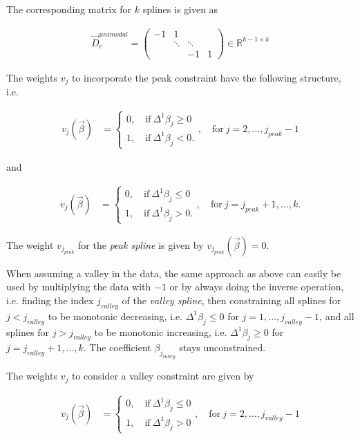 \documentclass[10pt,a4paper]{report}
\begin{document}
The corresponding matrix for $k$ splines is given as 

\begin{align}\label{eq:D_c_unimodal}
	\vec{D}_c^{unimodal} = \begin{pmatrix} -1 & 1 \\ 
		& \ddots & \ddots  \\
		& & -1 & 1
	\end{pmatrix} \in \mathbb{R}^{k-1 \times k}
\end{align}

The weights $v_j$ to incorporate the peak constraint have the following structure, i.e.

\begin{align}\label{eq:v_peak_1}
	v_j(\vec{\beta}) &= \begin{cases} 
		0, \quad \text{if} \ \Delta^1\beta_j \ge 0 \\ 
		1, \quad \text{if} \ \Delta^1\beta_j  < 0.
	\end{cases}, \quad \text{for} \ j=2, \dots, j_{peak}-1
\end{align}

and

\begin{align}\label{eq:v_peak_2}
	v_j(\vec{\beta}) &= \begin{cases} 
		0, \quad \text{if} \ \Delta^1\beta_j \le 0 \\ 
		1, \quad \text{if} \ \Delta^1\beta_j > 0.
	\end{cases}, \quad \text{for} \ j=j_{peak}+1, \dots, k.
\end{align}

The weight $v_{j_{peak}}$ for the \emph{peak spline} is given by $v_{j_{peak}}(\vec{\beta}) = 0$. 

When assuming a valley in the data, the same approach as above can easily be used by multiplying the data with $-1$ or by always doing the inverse operation, i.e. finding the index $j_{valley}$ of the \emph{valley spline}, then constraining all splines for $j < j_{valley}$ to be monotonic decreasing, i.e. $\Delta^1 \beta_j \le 0$ for $j = 1, \dots, j_{valley}-1$, and all splines for $j > j_{valley}$ to be monotonic increasing, i.e. $\Delta^1 \beta_j \ge 0$ for $j = j_{valley}+1, \dots, k$. The coefficient $\beta_{j_{valley}}$ stays unconstrained. 

The weights $v_j$ to consider a valley constraint are given by

\begin{align}\label{eq:v_valley_1}
	v_j(\vec{\beta}) &= \begin{cases} 
		0, \quad \text{if} \ \Delta^1\beta_j \le 0 \\ 
		1, \quad \text{if} \ \Delta^1\beta_j > 0
	\end{cases}, \quad \text{for} \ j=2, \dots, j_{valley}-1
\end{align}
\end{document}
